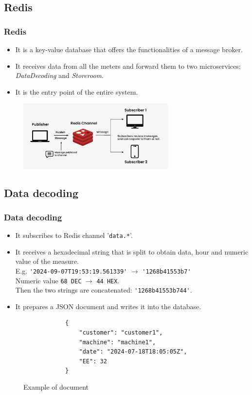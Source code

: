 \subsection{Redis}
\begin{frame}
	\frametitle{Redis}
	
	\begin{itemize}
		\item It is a key-value database that offers the functionalities of a message broker.
		\item It receives data from all the meters and forward them to two microservices: \emph{DataDecoding} and \emph{Storeroom}.
		\item It is the entry point of the entire system.
	\end{itemize}
	
	\begin{figure}[h]
		\centering
		\includegraphics[width=0.7\textwidth]{./img/redis-publish-subscriber.png}
	\end{figure}
\end{frame}


\subsection{Data decoding}
\begin{frame}[containsverbatim]
	\frametitle{Data decoding}
	
	\begin{itemize}
		\item It subscribes to Redis channel '\verb|data.*|'.
		\item It receives a hexadecimal string that is split to obtain data, hour and numeric value of the measure.\\
		E.g. \verb|'2024-09-07T19:53:19.561339'| $\rightarrow$ \verb|'1268b41553b7'|\\
		Numeric value \verb|68 DEC| $\rightarrow$ \verb|44 HEX|.\\
		Then the two strings are concatenated: \verb|'1268b41553b744'|.
		\item It prepares a JSON document and writes it into the database.
	\end{itemize}
	
	\begin{figure}[h]
		\centering
		\begin{verbatim}
			{
				"customer": "customer1",
				"machine": "machine1",
				"date": "2024-07-18T18:05:05Z",
				"EE": 32
			}
		\end{verbatim}
		\caption{Example of document}
	\end{figure}
	
\end{frame}


